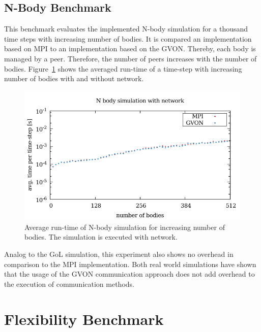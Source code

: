 \subsection{N-Body Benchmark}
This benchmark evaluates the implemented N-body simulation for a
thousand time steps with increasing number of bodies. It is compared
an implementation based on MPI to an implementation based on the GVON.
Thereby, each body is managed by a peer. Therefore, the number of
peers increases with the number of
bodies. Figure~\ref{fig:nbody_laser} shows the averaged run-time of a
time-step with increasing number of bodies with and without network.

\begin{figure}[H]
  \includegraphics[width=\textwidth]{plots/50_nbody_network_laser}
  \caption{Average run-time of N-body simulation for increasing
    number of bodies. The simulation is executed with network.}
  \label{fig:nbody_laser}
\end{figure}

\noindent Analog to the GoL simulation, this experiment also shows no
overhead in comparison to the MPI implementation. Both real world
simulations have shown that the usage of the GVON communication
approach does not add overhead to the execution of communication
methods.

\section{Flexibility Benchmark}

